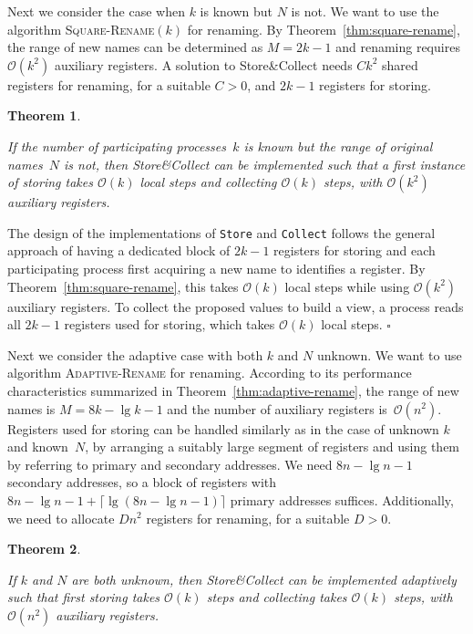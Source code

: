 \documentclass[11pt]{article}
\newcommand{\cO}{\mathcal{O}}
\newcommand{\qed}{\hfill $\square$ \smallbreak}
\newenvironment{proof}{\noindent{\bf Proof:}}{\qed}
\newtheorem{theorem}{Theorem}
\begin{document}
Next we consider the case when $k$ is known but $N$ is not.
We want to use the algorithm \textsc{Square-Rename}$(k)$ for renaming.
By Theorem~\ref{thm:square-rename}, the range of new names can be determined as $M = 2k-1$ and renaming requires $\cO(k^2)$ auxiliary registers.
A solution to Store\&Collect needs $Ck^2$ shared registers for renaming, for a suitable $C>0$, and $2k-1$ registers for storing.



\begin{theorem}
\label{thm:collect-only-k-known}

If the number of participating processes~$k$ is known but the range of original names~$N$ is not, then Store\&Collect can be implemented such that a first instance of storing takes $\cO(k)$ local steps and collecting $\cO(k)$ steps, with $\cO(k^2)$ auxiliary registers.
\end{theorem}

\begin{proof}
The design of the implementations of \texttt{Store} and \texttt{Collect} follows the general approach of having a dedicated block of $2k-1$ registers for storing and each participating process first acquiring a new name to identifies a register.
By Theorem~\ref{thm:square-rename}, this takes $\cO(k)$ local steps while using $\cO(k^2)$ auxiliary registers.
To collect the proposed values to build a view, a process reads all $2k-1$ registers used for storing, which takes $\cO(k)$ local steps.
\end{proof}

Next we consider the adaptive case with both $k$ and $N$ unknown.
We want to use algorithm \textsc{Adaptive-Rename} for renaming. 
According to its performance characteristics summarized in Theorem~\ref{thm:adaptive-rename}, the range of new names is $M=8k-\lg k-1$ and the number of auxiliary registers is~$\cO(n^2)$.
Registers used for storing can be handled similarly as in the case of unknown $k$ and known~$N$, by arranging a suitably large segment of registers and using them by referring to primary and secondary addresses.
We need $8n -\lg n-1$ secondary addresses, so a block of registers with $8n -\lg n-1 + \lceil \lg(8n -\lg n-1) \rceil$ primary addresses suffices.
Additionally, we need to allocate $Dn^2$ registers for renaming, for a suitable $D>0$.


\begin{theorem}
\label{thm:collect-3}

If $k$ and $N$ are both unknown, then Store\&Collect can be implemented adaptively such that first storing takes $\cO(k)$ steps and collecting takes $\cO(k)$ steps, with $\cO(n^2)$ auxiliary registers.
\end{theorem}
\end{document}
